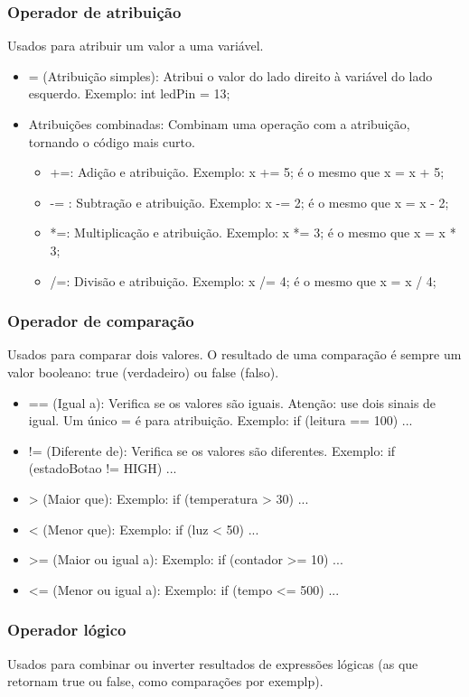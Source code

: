 \documentclass{report}
\begin{document}
	\subsubsection{Operador de atribuição}
	Usados para atribuir um valor a uma variável.
	
	\begin{itemize}
		\item = (Atribuição simples): Atribui o valor do lado direito à variável do lado esquerdo. Exemplo: int ledPin = 13;
		\item Atribuições combinadas: Combinam uma operação com a atribuição, tornando o código mais curto.
		\begin{itemize}
			\item +=: Adição e atribuição. Exemplo: x += 5; é o mesmo que x = x + 5;
			\item -= : Subtração e atribuição. Exemplo: x -= 2; é o mesmo que x = x - 2;
			\item *=: Multiplicação e atribuição. Exemplo: x *= 3; é o mesmo que x = x * 3;
			\item /=: Divisão e atribuição. Exemplo: x /= 4; é o mesmo que x = x / 4;
		\end{itemize}
	\end{itemize}
	\subsubsection{Operador de comparação}
	Usados para comparar dois valores. O resultado de uma comparação é sempre um valor booleano: true (verdadeiro) ou false (falso).
	
	\begin{itemize}
		\item == (Igual a): Verifica se os valores são iguais. Atenção: use dois sinais de igual. Um único = é para atribuição. Exemplo: if (leitura == 100) { ... }
		\item != (Diferente de): Verifica se os valores são diferentes. Exemplo: if (estadoBotao != HIGH) { ... }
		\item > (Maior que): Exemplo: if (temperatura > 30) { ... }
		\item < (Menor que): Exemplo: if (luz < 50) { ... }
		\item >= (Maior ou igual a): Exemplo: if (contador >= 10) { ... }
		\item <= (Menor ou igual a): Exemplo: if (tempo <= 500) { ... }
		
	\end{itemize}
	\subsubsection{Operador lógico}
	Usados para combinar ou inverter resultados de expressões lógicas (as que retornam true ou false, como comparações por exemplp).
	
\end{document}
